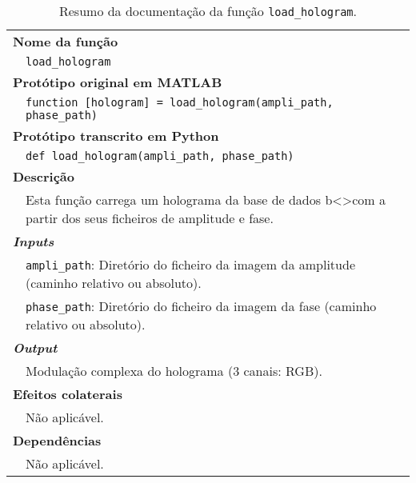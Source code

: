 \begin{table}[!htbp]
    \centering
    \caption{Resumo da documentação da função \texttt{load\_hologram}.}
    \label{tab:load_hologram}
    \begin{tabular}{p{1cm} p{10cm}}
        \hline
        \multicolumn{2}{l}{\bfseries Nome da função}\\
         & \verb|load_hologram|\\
        \hline
        \multicolumn{2}{l}{\bfseries Protótipo original em MATLAB}\\
         & \texttt{function [hologram] = load_hologram(ampli_path, phase_path)}\\
        \hline
        \multicolumn{2}{l}{\bfseries Protótipo transcrito em Python}\\
         & \texttt{def load_hologram(ampli_path, phase_path)} \\
        \hline\multicolumn{2}{l}{\bfseries Descrição}\\
         & Esta função carrega um holograma da base de dados b<>com a partir dos seus ficheiros de amplitude e fase.\\
        \hline\multicolumn{2}{l}{\bfseries \textit{Inputs}}\\
         & \verb|ampli_path|: Diretório do ficheiro da imagem da amplitude (caminho relativo ou absoluto).\\
         & \verb|phase_path|: Diretório do ficheiro da imagem da fase (caminho relativo ou absoluto).\\
        \hline\multicolumn{2}{l}{\bfseries \textit{Output}}\\
         & Modulação complexa do holograma (3 canais: \ac{RGB}).\\
        \hline\multicolumn{2}{l}{\bfseries Efeitos colaterais}\\
         & Não aplicável. \\
        \hline\multicolumn{2}{l}{\bfseries Dependências}\\
         & Não aplicável. \\
        \hline
    \end{tabular}
\end{table}



